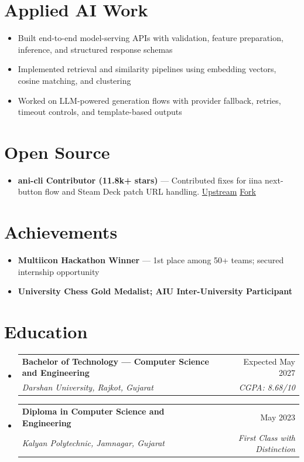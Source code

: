 \documentclass[11pt,a4paper]{article}
\makeatletter
\newcommand{\resumeSubheading}[4]{
  \vspace{-1pt}\item
    \begin{tabular*}{0.97\textwidth}[t]{l@{\extracolsep{\fill}}r}
      \textbf{#1} & #2 \\
      \textit{#3} & \textit{#4} \\
    \end{tabular*}\vspace{-3pt}
}
\newcommand{\resumeItem}[1]{
  \item\small{#1 \vspace{-1pt}}
}
\makeatother
\begin{document}
\section{Applied AI Work}
\begin{itemize}[leftmargin=*]
  \resumeItem{Built end-to-end model-serving APIs with validation, feature preparation, inference, and structured response schemas}
  \resumeItem{Implemented retrieval and similarity pipelines using embedding vectors, cosine matching, and clustering}
  \resumeItem{Worked on LLM-powered generation flows with provider fallback, retries, timeout controls, and template-based outputs}
\end{itemize}

\section{Open Source}
\begin{itemize}[leftmargin=*]
  \resumeItem{\textbf{ani-cli Contributor (11.8k+ stars)} --- Contributed fixes for iina next-button flow and Steam Deck patch URL handling. \href{https://github.com/pystardust/ani-cli}{Upstream} \textbar{} \href{https://github.com/Dhairya3391/ani-cli}{Fork}}
\end{itemize}

\section{Achievements}
\begin{itemize}[leftmargin=*]
  \resumeItem{\textbf{Multiicon Hackathon Winner} --- 1st place among 50+ teams; secured internship opportunity}
  \resumeItem{\textbf{University Chess Gold Medalist; AIU Inter-University Participant}}
\end{itemize}

\section{Education}
\begin{itemize}[leftmargin=*]

\resumeSubheading
{Bachelor of Technology --- Computer Science and Engineering}{Expected May 2027}
{Darshan University, Rajkot, Gujarat}{CGPA: 8.68/10}

\resumeSubheading
{Diploma in Computer Science and Engineering}{May 2023}
{Kalyan Polytechnic, Jamnagar, Gujarat}{First Class with Distinction}

\end{itemize}
\end{document}
